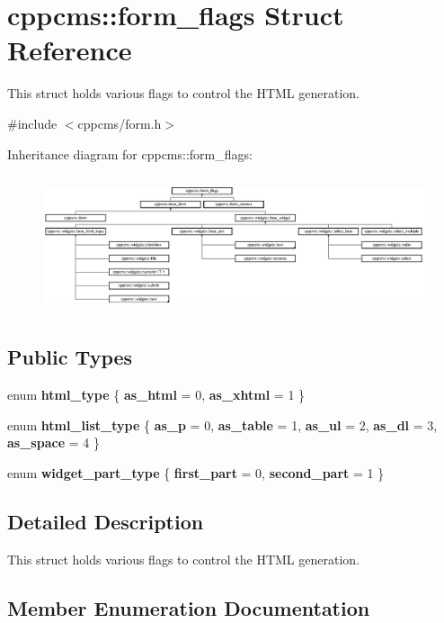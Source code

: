 \section{cppcms\-:\-:form\-\_\-flags \-Struct \-Reference}
\label{structcppcms_1_1form__flags}


\-This struct holds various flags to control the \-H\-T\-M\-L generation.  




{\ttfamily \#include $<$cppcms/form.\-h$>$}

\-Inheritance diagram for cppcms\-:\-:form\-\_\-flags\-:\begin{figure}[H]
\begin{center}
\leavevmode
\includegraphics[height=4.057971cm]{structcppcms_1_1form__flags}
\end{center}
\end{figure}
\subsection*{\-Public \-Types}
\begin{DoxyCompactItemize}
\item 
enum {\bf html\-\_\-type} \{ {\bf as\-\_\-html} =  0, 
{\bf as\-\_\-xhtml} =  1
 \}
\item 
enum {\bf html\-\_\-list\-\_\-type} \{ \*
{\bf as\-\_\-p} =  0, 
{\bf as\-\_\-table} =  1, 
{\bf as\-\_\-ul} =  2, 
{\bf as\-\_\-dl} =  3, 
\*
{\bf as\-\_\-space} =  4
 \}
\item 
enum {\bf widget\-\_\-part\-\_\-type} \{ {\bf first\-\_\-part} =  0, 
{\bf second\-\_\-part} =  1
 \}
\end{DoxyCompactItemize}


\subsection{\-Detailed \-Description}
\-This struct holds various flags to control the \-H\-T\-M\-L generation. 

\subsection{\-Member \-Enumeration \-Documentation}
